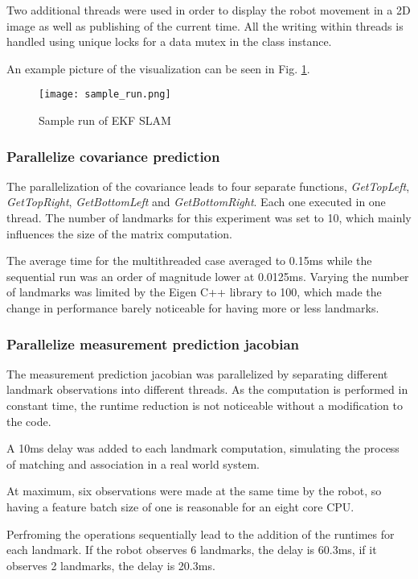 \documentclass[conference]{IEEEtran}
\begin{document}
Two additional threads were used in order to display the robot movement in a 2D image as well as publishing of the current time. All the writing within threads is handled using unique locks for a data mutex in the class instance.

An example picture of the visualization can be seen in Fig. \ref{fig:sample_run}. 

 \begin{figure}[!h]
    \centering
    \texttt{[image: sample\_run.png]}
    \caption{Sample run of EKF SLAM}
    \label{fig:sample_run}
\end{figure}
    
\subsubsection{Parallelize covariance prediction} 

The parallelization of the covariance leads to four separate functions, \textit{GetTopLeft}, \textit{GetTopRight}, \textit{GetBottomLeft} and \textit{GetBottomRight}. Each one executed in one thread. The number of landmarks for this experiment was set to 10, which mainly influences the size of the matrix computation.

The average time for the multithreaded case averaged to 0.15ms while the sequential run was an order of magnitude lower at 0.0125ms. Varying the number of landmarks was limited by the Eigen C++ library to 100, which made the change in performance barely noticeable for having more or less landmarks. 

\subsubsection{Parallelize measurement prediction jacobian} 
The measurement prediction jacobian was parallelized by separating different landmark observations into different threads. As the computation is performed in constant time, the runtime reduction is not noticeable without a modification to the code. 

A 10ms delay was added to each landmark computation, simulating the process of matching and association in a real world system. 

At maximum, six observations were made at the same time by the robot, so having a feature batch size of one is reasonable for an eight core CPU. 

Perfroming the operations sequentially lead to the addition of the runtimes for each landmark. If the robot observes 6 landmarks, the delay is 60.3ms, if it observes 2 landmarks, the delay is 20.3ms.
\end{document}
